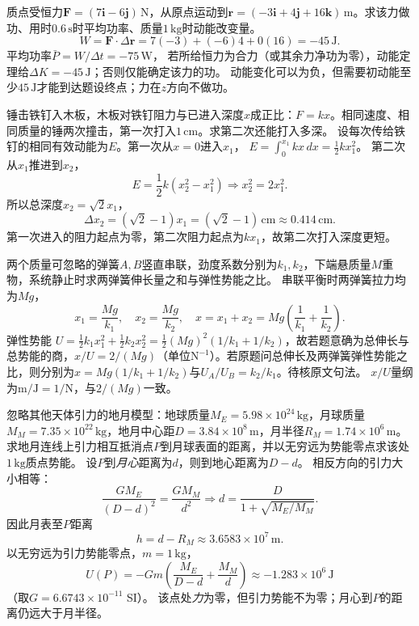 \problemtext 质点受恒力$\bm F=(7\bm i-6\bm j)\,\mathrm N$，从原点运动到$\bm r=(-3\bm i+4\bm j+16\bm k)\,\mathrm m$。求该力做功、用时$0.6\,\mathrm s$时平均功率、质量$1\,\mathrm{kg}$时动能改变量。
\workings
\[
W=\bm F\cdot\Delta\bm r=7(-3)+(-6)4+0(16)
=\boxed{-45\,\mathrm J}.
\]
平均功率$\boxed{\bar P=W/\Delta t=-75\,\mathrm W}$，
若所给恒力为合力（或其余力净功为零），动能定理给$\boxed{\Delta K=-45\,\mathrm J}$；否则仅能确定该力的功。
\crosscheck 动能变化可以为负，但需要初动能至少$45\,\mathrm J$才能到达题设终点；力在$z$方向不做功。

\problemtext 锤击铁钉入木板，木板对铁钉阻力与已进入深度$x$成正比：$F=kx$。相同速度、相同质量的锤两次撞击，第一次打入$1\,\mathrm{cm}$。求第二次还能打入多深。
\workings
设每次传给铁钉的相同有效动能为$E$。第一次从$x=0$进入$x_1$，
$E=\int_0^{x_1}kx\,dx=\frac12kx_1^2$。
第二次从$x_1$推进到$x_2$，
\[
E=\frac12k(x_2^2-x_1^2)
\Longrightarrow x_2^2=2x_1^2.
\]
所以总深度$x_2=\sqrt2 x_1$，
\[
\boxed{\Delta x_2=(\sqrt2-1)x_1
=(\sqrt2-1)\,\mathrm{cm}\approx0.414\,\mathrm{cm}}.
\]
\crosscheck 第一次进入的阻力起点为零，第二次阻力起点为$kx_1$，故第二次打入深度更短。

\problemtext 两个质量可忽略的弹簧$A,B$竖直串联，劲度系数分别为$k_1,k_2$，下端悬质量$M$重物，系统静止时求两弹簧伸长量之和与弹性势能之比。
\workings
串联平衡时两弹簧拉力均为$Mg$，
\[
x_1=\frac{Mg}{k_1},\quad x_2=\frac{Mg}{k_2},\quad
x=x_1+x_2=Mg\left(\frac1{k_1}+\frac1{k_2}\right).
\]
弹性势能
$U=\frac12 k_1x_1^2+\frac12k_2x_2^2
=\frac12(Mg)^2(1/k_1+1/k_2)$，故若题意确为总伸长与总势能的商，$\boxed{x/U=2/(Mg)}$（单位$\mathrm{N^{-1}}$）。若原题问总伸长及两弹簧弹性势能之比，则分别为$x=Mg(1/k_1+1/k_2)$与$\boxed{U_A/U_B=k_2/k_1}$。待核原文句法。
\crosscheck $x/U$量纲为$\mathrm{m/J=1/N}$，与$2/(Mg)$一致。

\problemtext 忽略其他天体引力的地月模型：地球质量$M_E=5.98\times10^{24}\,\mathrm{kg}$，月球质量$M_M=7.35\times10^{22}\,\mathrm{kg}$，地月中心距$D=3.84\times10^8\,\mathrm m$，月半径$R_M=1.74\times10^6\,\mathrm m$。
求地月连线上引力相互抵消点$P$到月球表面的距离，并以无穷远为势能零点求该处$1\,\mathrm{kg}$质点势能。
\workings
设$P$到\emph{月心}距离为$d$，则到地心距离为$D-d$。
相反方向的引力大小相等：
\[
\frac{GM_E}{(D-d)^2}=\frac{GM_M}{d^2}
\Longrightarrow d=\frac{D}{1+\sqrt{M_E/M_M}}.
\]
因此月表至$P$距离
\[
\boxed{h=d-R_M\approx3.6583\times10^7\,\mathrm m}.
\]
以无穷远为引力势能零点，$m=1\,\mathrm{kg}$，
\[
\boxed{U(P)=-Gm\left(\frac{M_E}{D-d}+\frac{M_M}{d}\right)
\approx-1.283\times10^6\,\mathrm J}
\]
（取$G=6.6743\times10^{-11}$ SI）。
\crosscheck 该点处\emph{力}为零，但引力势能不为零；月心到$P$的距离仍远大于月半径。

